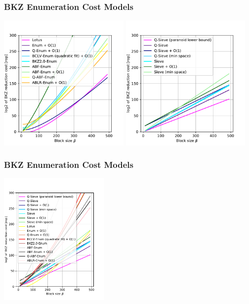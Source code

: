 \documentclass[t, aspectratio=169]{beamer}
\begin{document}
\begin{frame}
    \frametitle{BKZ Enumeration Cost Models}
    \centering
    \includegraphics[width=0.48\textwidth]{../thesis/graphics/cost_models_enum.pdf}%
    \includegraphics[width=0.48\textwidth]{../thesis/graphics/cost_models_sieving.pdf}
\end{frame} %
\begin{frame}
    \frametitle{BKZ Enumeration Cost Models}
    \centering
    \includegraphics[width=0.4\textwidth]{../thesis/graphics/cost_models.pdf}

\end{frame}%
\end{document}
